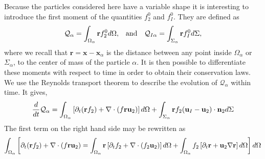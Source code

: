 Because the particles considered here have a variable shape it is interesting to introduce the first moment of the quantities $f_2^0$ and $f_I^0$. They are defined as %
\begin{align}
    &\mathcal{Q}_\alpha 
    = \int_{\Omega_\alpha}  \textbf{r} f_2^0  d\Omega,
    &\text{and}&
    &\mathcal{Q}_{I\alpha}
    = \int_{\Sigma_\alpha}  \textbf{r} f_I^0  d\Sigma,
    \label{eq:first_moment_definition}
\end{align}
where we recall that $\textbf{r} = \textbf{x} - \textbf{x}_\alpha$ is the distance between any point inside $\Omega_\alpha$ or $\Sigma_\alpha$, to the center of mass of the particle $\alpha$.
It is then possible to differentiate these moments with respect to time in order to obtain their conservation laws.
We use the Reynolds transport theorem to describe the evolution of $\mathcal{Q}_\alpha$ within time. 
It gives, 
\begin{equation}
    \frac{d}{dt} \mathcal{Q}_\alpha
      =  \int_{\Omega_\alpha} \left[
        \partial_t(\textbf{r}  f_2)
        + \mathbf{\nabla}\cdot \left(f \textbf{r} \textbf{u}_2\right)
    \right]d\Omega + \int_{\Sigma_\alpha} \textbf{r}  f_2  (\textbf{u}_I-\textbf{u}_2)\cdot \textbf{n}_2  d\Sigma  \nonumber
\end{equation}
The first term on the right hand side may be rewritten as
\begin{equation}
\int_{\Omega_\alpha} \left[
        \partial_t(\textbf{r}  f_2)+ \mathbf{\nabla}\cdot \left(f \textbf{r} \textbf{u}_2\right) = \int_{\Omega_\alpha} \textbf{r}\left[
        \partial_t f_2
        + \mathbf{\nabla}\cdot \left(f_2 \textbf{u}_2\right)
    \right] d\Omega
    + \int_{\Omega_\alpha} f_2 \left[
        \partial_t \textbf{r}
        +\textbf{u}_2 \mathbf{\nabla} \textbf{r}
    \right]d\Omega
    \right]d\Omega
\end{equation}

